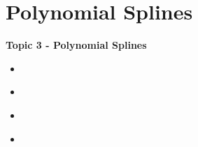 \documentclass[fleqn]{beamer} %
\newcommand{\sectionIIItitle}{Polynomial Splines}
\newcommand{\sectionIIsubsectionIIItitle}{}
\newcommand{\sectionIIsubsectionIVtitle}{}
\newcommand{\sectionIIIsubsectionItitle}{}
\newcommand{\sectionIIIsubsectionIItitle}{}
\newcommand{\sectionIIIsubsectionIIItitle}{}
\newcommand{\sectionIIIsubsectionIVtitle}{}
\begin{document}
		\subsection{\sectionIIsubsectionIIItitle}\label{sectionIIsubsectionIII}

			\begin{frame}
				\frametitle{\sectionIIsubsectionIIItitle} \small
				\bigskip

				
				\btVFill 
			\end{frame}

			\begin{frame}
				\frametitle{\sectionIIsubsectionIIItitle}\small
				\bigskip


				\btVFill 
			\end{frame}


		\subsection{\sectionIIsubsectionIVtitle}\label{sectionIIsubsectionIV}

			\begin{frame}
				\frametitle{\sectionIIsubsectionIVtitle}
				\bigskip

				
				\btVFill 
			\end{frame}

			\begin{frame}
				\frametitle{\sectionIIsubsectionIVtitle}
				\bigskip


				\btVFill 
			\end{frame}
		

	\section{\sectionIIItitle}\label{sectionIII}

		\begin{frame}
			\large \textbf{Topic 3 - \sectionIIItitle} \vspace{3mm}\\

			\begin{itemize}
				\item \hyperlink{sectionIIIsubsectionI}{\sectionIIIsubsectionItitle} \vspc %
				\item \hyperlink{sectionIIIsubsectionII}{\sectionIIIsubsectionIItitle} \vspc %
				\item \hyperlink{sectionIIIsubsectionIII}{\sectionIIIsubsectionIIItitle} \vspc %
				\item \hyperlink{sectionIIIsubsectionIV}{\sectionIIIsubsectionIVtitle} \vspc %
			\end{itemize}

		\end{frame}
\end{document}
